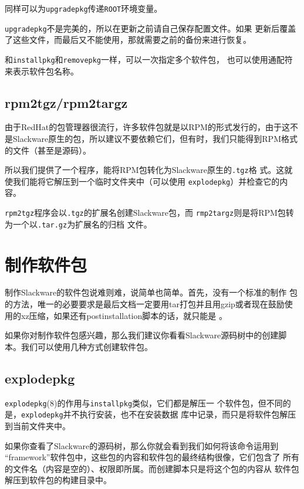 同样可以为\texttt{upgradepkg}传递\texttt{ROOT}环境变量。

\texttt{upgradepkg}不是完美的，所以在更新之前请自己保存配置文件。如果
更新后覆盖了这些文件，而最后又不能使用，那就需要之前的备份来进行恢复。

和\texttt{installpkg}和\texttt{removepkg}一样，可以一次指定多个软件包，
也可以使用通配符来表示软件包名称。

\subsection{rpm2tgz/rpm2targz}
\label{sec:packageManagement:utilities:rpm2}
由于RedHat的包管理器很流行，许多软件包就是以RPM的形式发行的，由于这不
是Slackware原生的包，所以建议不要依赖它们，但有时，我们只能得到RPM格式
的文件（甚至是源码）。

所以我们提供了一个程序，能将RPM包转化为Slackware原生的\texttt{.tgz}格
式。这就使我们能将它解压到一个临时文件夹中（可以使用
\texttt{explodepkg}）并检查它的内容。

\texttt{rpm2tgz}程序会以\texttt{.tgz}的扩展名创建Slackware包，而
\texttt{rmp2targz}则是将RPM包转为一个以\texttt{.tar.gz}为扩展名的归档
文件。

\section{制作软件包}
\label{sec:packageManagement:makingPackages}
制作Slackware的软件包说难则难，说简单也简单。首先，没有一个标准的制作
包的方法，唯一的必要要求是最后文档一定要用tar打包并且用gzip或者现在鼓励使用的xz压缩，如果还有postinstallation脚本的话，就只能是
。

如果你对制作软件包感兴趣，那么我们建议你看看Slackware源码树中的创建脚
本。我们可以使用几种方式创建软件包。


\subsection{explodepkg}
\label{sec:packageManagement:makingPackages:explodepkg}
\texttt{explodepkg}(8)的作用与\texttt{installpkg}类似，它们都是解压一
个软件包，但不同的是，\texttt{explodepkg}并不执行安装，也不在安装数据
库中记录，而只是将软件包解压到当前文件夹中。

如果你查看了Slackware的源码树，那么你就会看到我们如何将该命令运用到
``framework''软件包中，这些包的内容和软件包的最终结构很像，它们包含了
所有的文件名（内容是空的）、权限即所属。而创建脚本只是将这个包的内容从
软件包解压到软件包的构建目录中。

